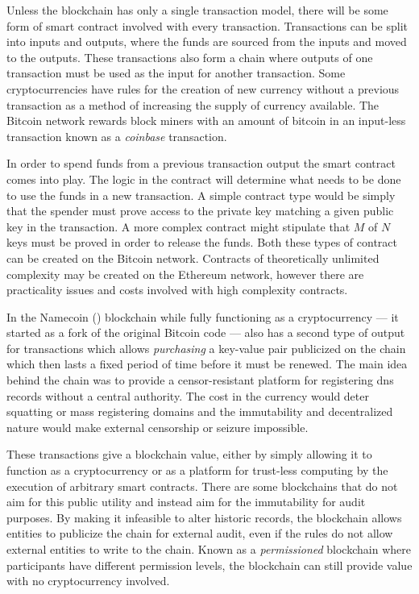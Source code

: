 Unless the blockchain has only a single transaction model, there will be some form of smart contract involved with every transaction. Transactions can be split into inputs and outputs, where the funds are sourced from the inputs and moved to the outputs. These transactions also form a chain where outputs of one transaction must be used as the input for another transaction. Some cryptocurrencies have rules for the creation of new currency without a previous transaction as a method of increasing the supply of currency available. The Bitcoin network rewards block miners with an amount of bitcoin in an input-less transaction known as a \emph{coinbase} transaction.

In order to spend funds from a previous transaction output the smart contract comes into play. The logic in the contract will determine what needs to be done to use the funds in a new transaction. A simple contract type would be simply that the spender must prove access to the private key matching a given public key in the transaction. A more complex contract might stipulate that $M$ of $N$ keys must be proved in order to release the funds. Both these types of contract can be created on the Bitcoin network. Contracts of theoretically unlimited complexity may be created on the Ethereum network, however there are practicality issues and costs involved with high complexity contracts.


In the Namecoin () blockchain while fully functioning as a cryptocurrency --- it started as a fork of the original Bitcoin code --- also has a second type of output for transactions which allows \emph{purchasing} a key-value pair publicized on the chain which then lasts a fixed period of time before it must be renewed. The main idea behind the chain was to provide a censor-resistant platform for registering \gls{dns} records without a central authority. The cost in the currency would deter squatting or mass registering domains and the immutability and decentralized nature would make external censorship or seizure impossible.

These transactions give a blockchain value, either by simply allowing it to function as a cryptocurrency or as a platform for trust-less computing by the execution of arbitrary smart contracts. There are some blockchains that do not aim for this public utility and instead aim for the immutability for audit purposes. By making it infeasible to alter historic records, the blockchain allows entities to publicize the chain for external audit, even if the rules do not allow external entities to write to the chain. Known as a \emph{permissioned} blockchain where participants have different permission levels, the blockchain can still provide value with no cryptocurrency involved.

